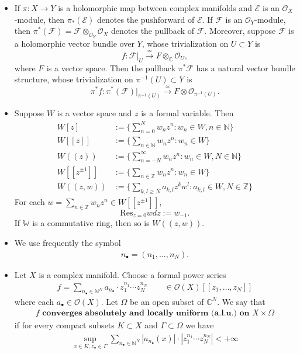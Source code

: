 \documentclass[11pt,b5paper,notitlepage]{article}
\theoremstyle{definition}
\theoremstyle{plain}
\newcommand{\Res}{\mathrm{Res}}
\newcommand{\scr}{\mathscr}
\newcommand{\blt}{\bullet}
\newcommand{\Wbb}{\mathbb W}
\newcommand{\Cbb}{\mathbb C}
\newcommand{\Nbb}{\mathbb N}
\newcommand{\Zbb}{\mathbb Z}
\newcommand{\<}{\left\langle}
\renewcommand{\>}{\right\rangle}
\newcommand{\MO}{\mathcal{O}}
\newcommand{\ME}{\mathcal{E}}
\newcommand{\MF}{\mathcal{F}}
\numberwithin{equation}{subsection}
\begin{document}
\begin{subappendices}
\begin{itemize}
    \item If $\pi:X\rightarrow Y$ is a holomorphic map between complex manifolds and $\ME$ is an $\MO_X$-module, then $\pi_*(\ME)$ denotes the pushforward of $\ME$. If $\MF$ is an $\MO_Y$-module, then $\pi^*(\MF)=\MF\otimes_{\MO_Y}\MO_X$ denotes the pullback of $\MF$. Moreover, suppose $\MF$ is a holomorphic vector bundle over $Y$, whose trivialization on $U\subset Y$ is 
    $$
    f:\MF\vert_U\xrightarrow{\simeq} F\otimes_\Cbb \MO_U,
    $$
    where $F$ is a vector space. Then the pullback $\pi^*\MF$ has a natural vector bundle structure, whose trivialization on $\pi^{-1}(U)\subset Y$ is 
    $$
    \pi^*f:\pi^*(\MF)\vert_{\pi^{-1}(U)}\xrightarrow{\simeq} F\otimes \MO_{\pi^{-1}(U)}.
    $$
    \item Suppose $W$ is a vector space and $z$ is a formal variable. Then 
    $$
    \begin{aligned}
    W[z]&:=\{\sum_{n=0}^N w_n z^n:w_n\in W,n\in \Nbb\}\\
    W[[z]]&:=\{\sum_{n\in \Nbb}w_nz^n:w_n\in W\}\\
    W((z))&:=\{\sum_{n=-N}^{\infty}w_nz^n:w_n\in W,N\in \Nbb\}\\
    W[[z^{\pm 1}]]&:=\{\sum_{n\in \Zbb}w_nz^n:w_n\in W\}\\
    W((z,w))&:=\{\sum_{k,l\geq N}a_{k,l}z^k w^l:a_{k,l}\in W,N\in \Zbb\}
    \end{aligned}
    $$
    For each $w=\sum_{n\in \Zbb}w_nz^n\in W[[z^{\pm 1}]]$, 
    $$
    \Res_{z=0}wdz:=w_{-1}.
    $$
    If $\Wbb$ is a commutative ring, then so is $W((z,w))$.
\item We use frequently the symbol \index{n@$n_\blt=(n_1,\dots,n_N).$}
\begin{align}\label{eq33}
n_\blt=(n_1,\dots,n_N).
\end{align}
\item Let $X$ is a complex manifold. Choose a formal power series 
\begin{align*}
f=\sum_{n_\blt\in\Nbb^N}a_{n_\blt}\cdot z_1^{n_1}\cdots z_N^{n_N}\qquad\in\scr O(X)[[z_1,\dots,z_N]]
\end{align*}
where each $a_{\blt}\in\scr O(X)$. Let $\Omega$ be an open subset of $\Cbb^N$. We say that 
\begin{align}\label{eq34}
f\textbf{ converges absolutely and locally uniform (a.l.u.) on } X\times\Omega
\end{align}
if for every compact subsets $K\subset X$ and $\Gamma\subset \Omega$ we have
\begin{align*}
\sup_{x\in K,z_\blt\in\Gamma}\sum_{n_\blt\in\Nbb^N} |a_{n_\blt}(x)|\cdot |z_1^{n_1}\cdots z_N^{n_N}|<+\infty
\end{align*}
\end{itemize}

\end{subappendices}
\end{document}
